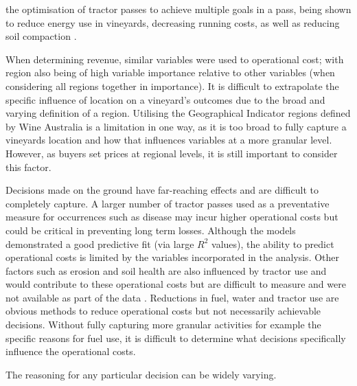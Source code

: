 \documentclass[review,12pt,authoryear]{elsarticle}
\begin{document}
\begin{linenumbers}
the optimisation of tractor passes to achieve multiple goals in a pass, being shown to reduce energy use in vineyards, decreasing running costs, as well as reducing soil compaction \citep{capelloEffectsTractorPasses2019}. 
\par
When determining revenue, similar variables were used to operational cost; with region also being of high variable importance relative to other variables (when considering all regions together in importance). It is difficult to extrapolate the specific influence of location on a vineyard's outcomes due to the broad and varying definition of a region. Utilising the Geographical Indicator regions defined by Wine Australia \citep{wineaustraliaWineAustraliaOpenData2021} is a limitation in one way, as it is too broad to fully capture a vineyards location and how that influences variables at a more granular level. However, as buyers set prices at regional levels, it is still important to consider this factor. 
\par
Decisions made on the ground have far-reaching effects and are difficult to completely capture. A larger number of tractor passes used as a preventative measure for occurrences such as disease may incur higher operational costs but could be critical in preventing long term losses. Although the models demonstrated a good predictive fit (via large $R^2$ values), the ability to predict operational costs is limited by the variables incorporated in the analysis. Other factors such as erosion and soil health are also influenced by tractor use and would contribute to these operational costs but are difficult to measure and were not available as part of the data \citep{capelloEffectsTractorPasses2019,capelloPermanentCoverSoil2020}. Reductions in fuel, water and tractor use are obvious methods to reduce operational costs but not necessarily achievable decisions. Without fully capturing more granular activities for example the specific reasons for fuel use, it is difficult to determine what decisions specifically influence the operational costs.
\par
The reasoning for any particular decision can be widely varying. 

\end{linenumbers}
\end{document}
